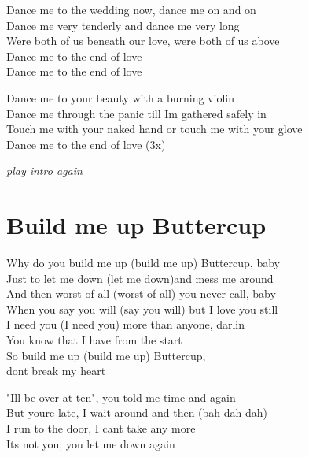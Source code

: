 \documentclass[
  letterpaper,
  a5paper]{memoir}
\begin{document}
Dance me to the wedding now, dance me on and on\\
Dance me very tenderly and dance me very long\\
We\textquotesingle re both of us beneath our love, we\textquotesingle re
both of us above\\
Dance me to the end of love\\
Dance me to the end of love

Dance me to your beauty with a burning violin\\
Dance me through the panic till I\textquotesingle m gathered safely in\\
Touch me with your naked hand or touch me with your glove\\
Dance me to the end of love (3x)

\emph{play intro again}

\hypertarget{build-me-up-buttercup}{%
\chapter{Build me up Buttercup}\label{build-me-up-buttercup}}

\begin{tcolorbox}[enhanced jigsaw, breakable, bottomrule=.15mm, colframe=quarto-callout-color-frame, rightrule=.15mm, opacityback=0, colback=white, arc=.35mm, toprule=.15mm, leftrule=.75mm, left=2mm]

Why do you build me up (build me up) Buttercup, baby\\
Just to let me down (let me down)and mess me around\\
And then worst of all (worst of all) you never call, baby\\
When you say you will (say you will) but I love you still\\
I need you (I need you) more than anyone, darlin\textquotesingle{}\\
You know that I have from the start\\
So build me up (build me up) Buttercup,\\
don\textquotesingle t break my heart

\end{tcolorbox}

"I\textquotesingle ll be over at ten", you told me time and again\\
But you\textquotesingle re late, I wait around and then (bah-dah-dah)\\
I run to the door, I can\textquotesingle t take any more\\
It\textquotesingle s not you, you let me down again
\end{document}
